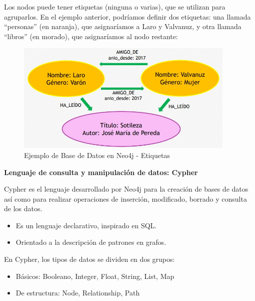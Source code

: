 \documentclass[preprint,12pt]{elsarticle}
\begin{document}
Los nodos puede tener etiquetas (ninguna o varias), que se utilizan para agruparlos. En el ejemplo anterior, podríamos definir dos etiquetas: una llamada “personas” (en naranja), que asignaríamos a Laro y Valvanuz, y otra llamada “libros” (en morado), que asignaríamos al nodo restante:

\begin{figure}[htb]
	\begin{center}
		\includegraphics[width=10.5cm]{./IMAGENES/NEO4J_ejemplo} 
		\caption{Ejemplo de Base de Datos en Neo4j - Etiquetas}
	\end{center}
\end{figure}

\textbf{Lenguaje de consulta y manipulación de datos: Cypher\\}

Cypher es el lenguaje desarrollado por Neo4j para la creación de bases de datos así como para realizar operaciones de inserción, modificado, borrado y consulta de los datos.
\begin{itemize}
 \item Es un lenguaje declarativo, inspirado en SQL.
 \item Orientado a la descripción de patrones en grafos.\\
\end{itemize}

En Cypher, los tipos de datos se dividen en dos grupos: 


\begin{itemize}
 \item Básicos: Booleano, Integer, Float, String, List,  Map
 \item De estructura: Node, Relationship, Path
\end{itemize}



 
\newpage
\end{document}
